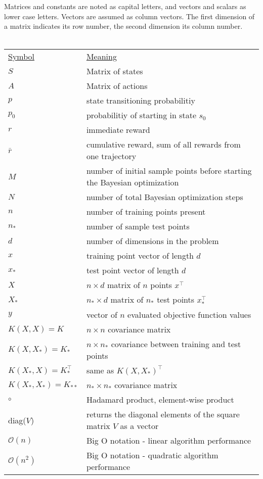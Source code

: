 Matrices and constants are noted as capital letters, and vectors and scalars as lower case letters. Vectors are assumed as column vectors. The first dimension of a matrix indicates its row number, the second dimension its column number.\\
\\
\begin{tabular}{l l}
    \underline{Symbol} & \underline{Meaning}\\
    $S$ & Matrix of states\\
    $A$ & Matrix of actions\\
    $p$ & state transitioning probabilitiy\\
    $p_0$ & probabilitiy of starting in state $s_0$\\
    $r$ & immediate reward\\
    $\bar{r}$ & cumulative reward, sum of all rewards from one trajectory\\
    $M$ & number of initial sample points before starting the Bayesian optimization\\
    $N$ & number of total Bayesian optimization steps\\
    $n$ & number of training points present\\
    $n_*$ & number of sample test points\\
    $d$ & number of dimensions in the problem\\
    $x$ & training point vector of length $d$\\
    $x_*$ & test point vector of length $d$\\
    $X$ & $n \times d$ matrix of $n$ points $x^{\top}$\\
    $X_*$ & $n_* \times d$ matrix of $n_*$ test points $x^{\top}_*$\\
    $y$ & vector of $n$ evaluated objective function values\\
    $K(X,X) = K$ & $n \times n$ covariance matrix\\
    $K(X,X_*) = K_*$ & $n \times n_*$ covariance between training and test points\\
    $K(X_*,X) = K_*^\top$ & same as $K(X,X_*)^{\top}$\\
    $K(X_*,X_*) = K_{**}$ & $n_* \times n_*$ covariance matrix\\
    $\circ$ & Hadamard product, element-wise product\\
    diag($V$) & returns the diagonal elements of the square matrix $V$ as a vector\\
    $\mathcal{O}(n)$ & Big O notation - linear algorithm performance\\
    $\mathcal{O}(n^2)$ & Big O notation - quadratic algorithm performance\\
\end{tabular}
